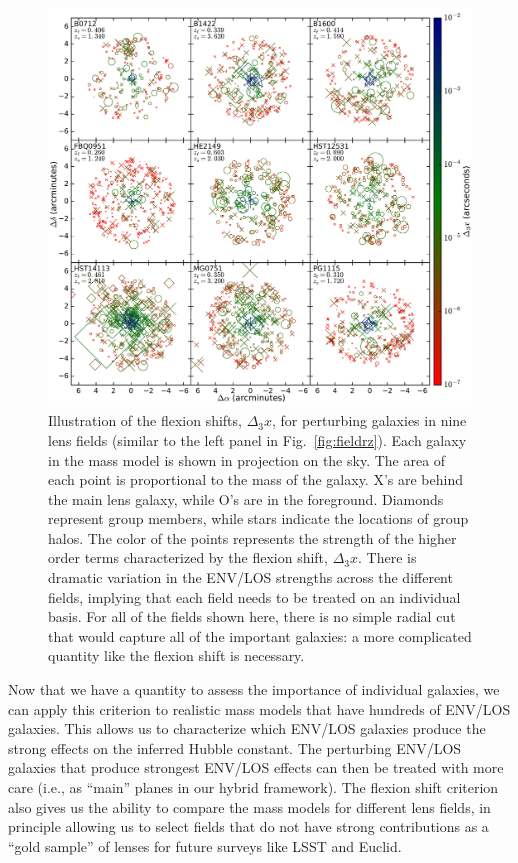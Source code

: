\documentclass{emulateapj}
\begin{document}
\begin{figure}
\begin{center}
\includegraphics[width=1\textwidth]{allfields.pdf}
\caption{\label{fig:allfields} Illustration of the flexion shifts, $\Delta_3 x$, for perturbing galaxies in nine lens fields (similar to the left panel in Fig.\ \ref{fig:fieldrz}). Each galaxy in the mass model is shown in projection on the sky. The area of each point is proportional to the mass of the galaxy. X's are behind the main lens galaxy, while O's are in the foreground. Diamonds represent group members, while stars indicate the locations of group halos. The color of the points represents the strength of the higher order terms characterized by the flexion shift, $\Delta_3 x$. There is dramatic variation in the ENV/LOS strengths across the different fields, implying that each field needs to be treated on an individual basis. For all of the fields shown here, there is no simple radial cut that would capture all of the important galaxies: a more complicated quantity like the flexion shift is necessary. 
}
\end{center}
\end{figure}

Now that we have a quantity to assess the importance of individual galaxies, we can apply this criterion to realistic mass models that have hundreds of ENV/LOS galaxies. This allows us to characterize which ENV/LOS galaxies produce the strong effects on the inferred Hubble constant. The perturbing ENV/LOS galaxies that produce strongest ENV/LOS effects can then be treated with more care (i.e., as ``main'' planes in our hybrid framework). The flexion shift criterion also gives us the ability to compare the mass models for different lens fields, in principle allowing us to select fields that do not have strong contributions as a ``gold sample'' of lenses for future surveys like LSST and Euclid. 
\end{document}
